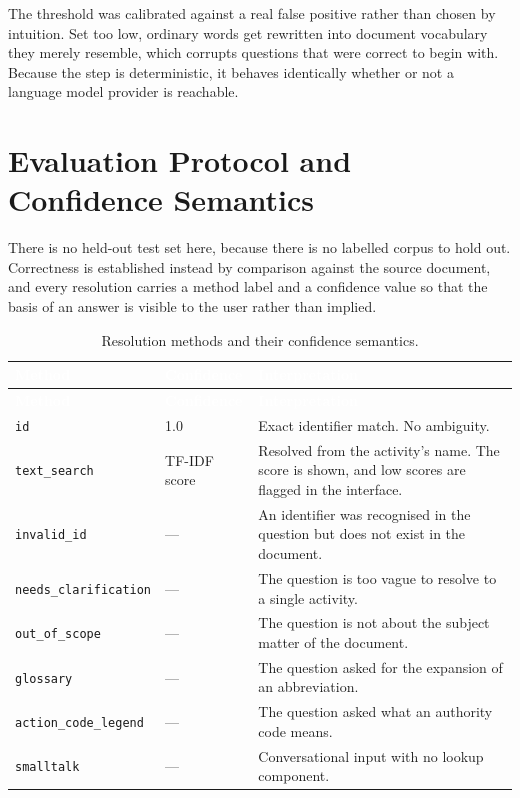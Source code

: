 The threshold was calibrated against a real false positive rather than chosen by intuition. Set too low, ordinary words get rewritten into document vocabulary they merely resemble, which corrupts questions that were correct to begin with. Because the step is deterministic, it behaves identically whether or not a language model provider is reachable.

\section{Evaluation Protocol and Confidence Semantics}

There is no held-out test set here, because there is no labelled corpus to hold out. Correctness is established instead by comparison against the source document, and every resolution carries a method label and a confidence value so that the basis of an answer is visible to the user rather than implied.

\begin{longtable}{|p{}|p{}|p{}|}
\caption{Resolution methods and their confidence semantics.}\label{tab:methods}\\
\hline
\rowcolor{thesisgreen}\textcolor{white}{\textbf{Method}} & \textcolor{white}{\textbf{Confidence}} & \textcolor{white}{\textbf{Interpretation}} \\
\hline
\endfirsthead
\hline
\rowcolor{thesisgreen}\textcolor{white}{\textbf{Method}} & \textcolor{white}{\textbf{Confidence}} & \textcolor{white}{\textbf{Interpretation}} \\
\hline
\endhead
\texttt{id} & 1.0 & Exact identifier match. No ambiguity. \\ \hline
\texttt{text\_search} & TF-IDF score & Resolved from the activity's name. The score is shown, and low scores are flagged in the interface. \\ \hline
\texttt{invalid\_id} & --- & An identifier was recognised in the question but does not exist in the document. \\ \hline
\texttt{needs\_clarification} & --- & The question is too vague to resolve to a single activity. \\ \hline
\texttt{out\_of\_scope} & --- & The question is not about the subject matter of the document. \\ \hline
\texttt{glossary} & --- & The question asked for the expansion of an abbreviation. \\ \hline
\texttt{action\_code\_legend} & --- & The question asked what an authority code means. \\ \hline
\texttt{smalltalk} & --- & Conversational input with no lookup component. \\ \hline
\end{longtable}

